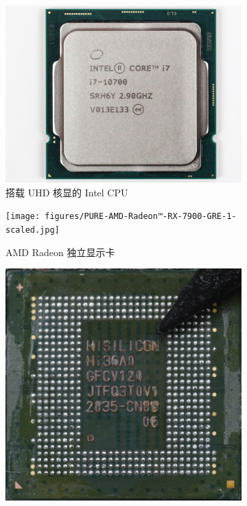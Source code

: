 \begin{figure}[htbp]
    \centering
    \begin{minipage}[b]{\textwidth}
        \begin{subfigure}[b]{0.34\textwidth}
            \includegraphics[width=\textwidth]{figures/10700-cpu-front.jpg}
            \caption{搭载 UHD 核显的 Intel CPU}
            \label{fig:sub_10700}
        \end{subfigure}
        \begin{subfigure}[b]{0.32\textwidth}
            \texttt{[image: figures/PURE-AMD-Radeon™-RX-7900-GRE-1-scaled.jpg]}
            \caption{AMD Radeon 独立显示卡}
            \label{fig:sub_7900gre}
        \end{subfigure}
        \begin{subfigure}[b]{0.33\textwidth}
            \includegraphics[width=\textwidth]{figures/Kirin-9000S.png}

\end{subfigure}
\end{minipage}
\end{figure}

